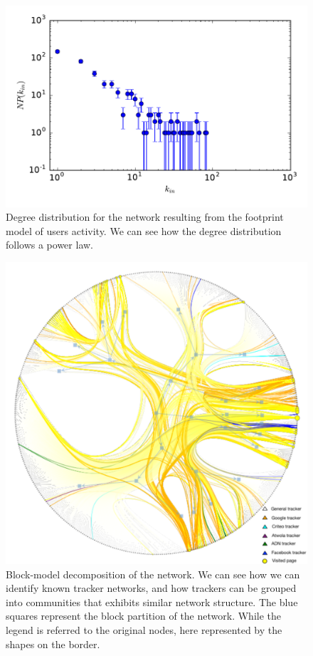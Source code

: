 \begin{figure}
\includegraphics[width=\textwidth]{figures/deg-dist.pdf}
\caption[User activity network degree distribution]{Degree distribution for the network resulting from the footprint model of users activity. We can see how the degree distribution follows a power law.}
\label{fig:deg-dist}
\end{figure}

\begin{figure}
\includegraphics[width=\textwidth]{figures/blockmodel.pdf}
\caption[Blockmodel decomposition of the tracker network]{Block-model decomposition of the network. We can see how we can identify known tracker networks, and how trackers can be grouped into communities that exhibits similar network structure. The blue squares represent the block partition of the network. While the legend is referred to the original nodes, here represented by the shapes on the border.}
\label{fig:blockmodel}
\end{figure}

